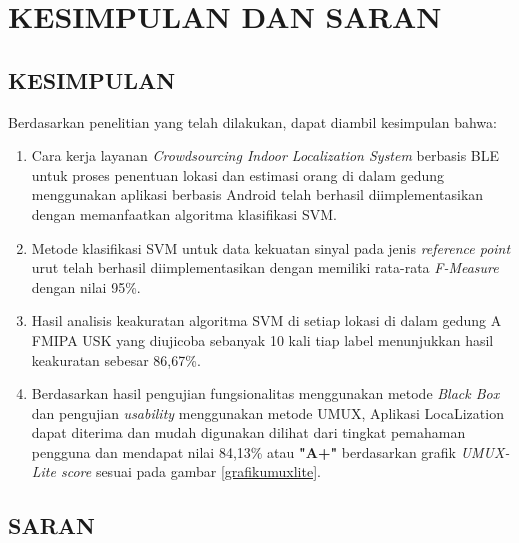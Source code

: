 \fancyhf{}
\fancyfoot[C]{\thepage}
\chapter{KESIMPULAN DAN SARAN}

\section{\uppercase{KESIMPULAN}}
Berdasarkan penelitian yang telah dilakukan, dapat diambil kesimpulan bahwa:
\begin{enumerate}
	\item Cara kerja layanan \textit{Crowdsourcing Indoor Localization System} berbasis BLE untuk proses penentuan lokasi dan estimasi orang di dalam gedung menggunakan aplikasi berbasis Android telah berhasil diimplementasikan dengan memanfaatkan algoritma klasifikasi SVM.
	\item Metode klasifikasi SVM untuk data kekuatan sinyal pada jenis \textit{reference point} urut telah berhasil diimplementasikan dengan memiliki rata-rata \textit{F-Measure} dengan nilai 95\%.
	\item Hasil analisis keakuratan algoritma SVM di setiap lokasi di dalam gedung A FMIPA USK yang diujicoba sebanyak 10 kali tiap label menunjukkan hasil keakuratan sebesar 86,67\%.
	\item Berdasarkan hasil pengujian fungsionalitas menggunakan metode \textit{Black Box} dan pengujian \textit{usability} menggunakan metode UMUX, Aplikasi LocaLization dapat diterima dan mudah digunakan dilihat dari tingkat pemahaman pengguna dan mendapat nilai 84,13\% atau \textbf{"A+"} berdasarkan grafik \textit{UMUX-Lite score} sesuai pada gambar \ref{grafikumuxlite}.
\end{enumerate}



\section{\uppercase{SARAN}}

